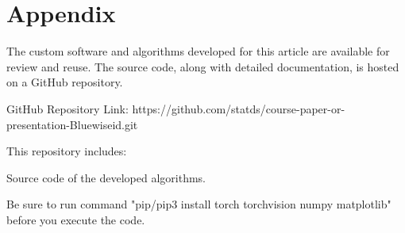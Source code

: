 \documentclass[12pt]{article}
\begin{document}
\appendix
\section*{Appendix}
The custom software and algorithms developed for this article are available for review and reuse. The source code, along with detailed documentation, is hosted on a GitHub repository.

GitHub Repository Link: https://github.com/statds/course-paper-or-presentation-Bluewiseid.git

This repository includes:

Source code of the developed algorithms.

Be sure to run command "pip/pip3 install torch torchvision numpy matplotlib" before you execute the code.



\cite{Advances}
\cite{Improvements}
\cite{OF}
\end{document}
